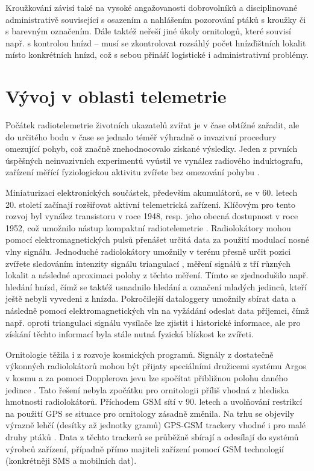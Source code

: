Kroužkování závisí také na vysoké angažovanosti dobrovolníků a disciplinované administrativě související s osazením a nahlášením pozorování ptáků s kroužky či s barevným označením. Dále taktéž neřeší jiné úkoly ornitologů, které souvisí např. s kontrolou hnízd -- musí se zkontrolovat rozsáhlý počet hnízďištních lokalit místo konkrétních hnízd, což s sebou přináší logistické i administrativní problémy.

\section{Vývoj v oblasti telemetrie}

Počátek radiotelemetrie životních ukazatelů zvířat je v čase obtížné zařadit, ale do určitého bodu v čase se jednalo téměř výhradně o invazivní procedury omezující pohyb, což značně znehodnocovalo získané výsledky. Jeden z prvních úspěšných neinvazivních experimentů vyústil ve vynález radiového induktografu, zařízení měřící fyziologickou aktivitu zvířete bez omezování pohybu \cite{fuller1948radio}.

Miniaturizací elektronických součástek, především akumulátorů, se v 60. letech 20. století začínají rozšiřovat aktivní telemetrická zařízení. Klíčovým pro tento rozvoj byl vynález transistoru v roce 1948, resp. jeho obecná dostupnost v roce 1952, což umožnilo nástup kompaktní radiotelemetrie \cite{amlaner2013handbook}. Radiolokátory mohou pomocí elektromagnetických pulsů přenášet určitá data za použití modulací nosné vlny signálu. Jednoduché radiolokátory umožnily v terénu přesně určit pozici zvířete sledováním intenzity signálu triangulací \cite{Farve2014}, měření signálů z tří různých lokalit a následné aproximaci polohy z těchto měření. Tímto se zjednodušilo např. hledání hnízd, čímž se taktéž usnadnilo hledání a označení mladých jedinců, kteří ještě nebyli vyvedeni z hnízda. Pokročilejší dataloggery umožnily sbírat data a následně pomocí elektromagnetických vln na vyžádání odeslat data příjemci, čímž např. oproti triangulaci signálu vysílače lze zjistit i historické informace, ale pro získání těchto informací byla stále nutná fyzická blízkost ke zvířeti.


Ornitologie těžila i z rozvoje kosmických programů. Signály z dostatečně výkonných radiolokátorů mohou být přijaty speciálními družicemi systému Argos v kosmu a za pomoci Dopplerova jevu lze spočítat přibližnou polohu daného jedince \cite{Farve2014}. Tato řešení nebyla zpočátku pro ornitologii příliš vhodná z hlediska hmotnosti radiolokátorů. Příchodem GSM sítí v 90. letech a uvolňování restrikcí na použití GPS se situace pro ornitology zásadně změnila. Na trhu se objevily výrazně lehčí (desítky až jednotky gramů) GPS-GSM trackery vhodné i pro malé druhy ptáků \cite{sokolov2011modern}. Data z těchto trackerů se průběžně sbírají a odesílají do systémů výrobců zařízení, případně přímo majiteli zařízení pomocí GSM technologií (konkrétněji SMS a mobilních dat).

